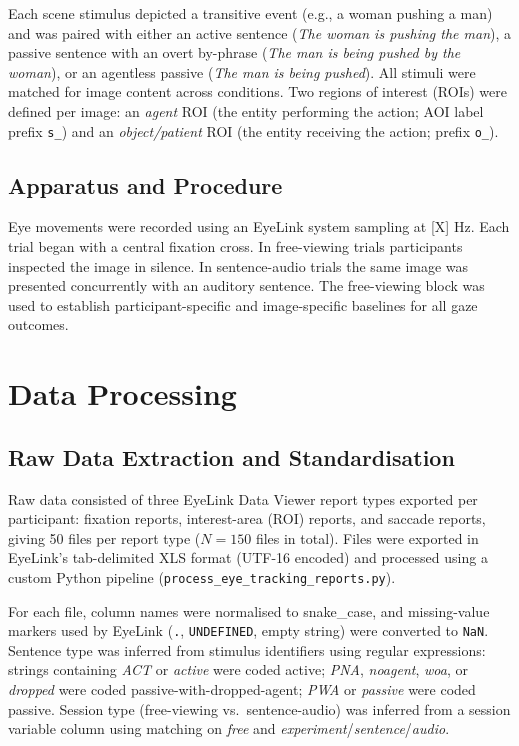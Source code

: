 \documentclass[12pt, a4paper]{article}
\begin{document}
Each scene stimulus depicted a transitive event (e.g., a woman pushing a man)
and was paired with either an active sentence (\textit{The woman is pushing the man}),
a passive sentence with an overt by-phrase (\textit{The man is being pushed by the woman}),
or an agentless passive (\textit{The man is being pushed}).
All stimuli were matched for image content across conditions.
Two regions of interest (ROIs) were defined per image: an \textit{agent} ROI
(the entity performing the action; AOI label prefix \texttt{s\_}) and an
\textit{object/patient} ROI (the entity receiving the action; prefix \texttt{o\_}).

\subsection{Apparatus and Procedure}

Eye movements were recorded using an EyeLink system sampling at [X] Hz.
Each trial began with a central fixation cross.
In free-viewing trials participants inspected the image in silence.
In sentence-audio trials the same image was presented concurrently with an
auditory sentence.
The free-viewing block was used to establish participant-specific and
image-specific baselines for all gaze outcomes.

\section{Data Processing}

\subsection{Raw Data Extraction and Standardisation}

Raw data consisted of three EyeLink Data Viewer report types exported per
participant: fixation reports, interest-area (ROI) reports, and saccade reports,
giving 50 files per report type ($N = 150$ files in total).
Files were exported in EyeLink's tab-delimited XLS format (UTF-16 encoded) and
processed using a custom Python pipeline (\texttt{process\_eye\_tracking\_reports.py}).

For each file, column names were normalised to snake\_case, and
missing-value markers used by EyeLink (\texttt{.}, \texttt{UNDEFINED},
empty string) were converted to \texttt{NaN}.
Sentence type was inferred from stimulus identifiers using regular expressions:
strings containing \textit{ACT} or \textit{active} were coded active;
\textit{PNA}, \textit{noagent}, \textit{woa}, or \textit{dropped} were coded
passive-with-dropped-agent; \textit{PWA} or \textit{passive} were coded passive.
Session type (free-viewing vs.\ sentence-audio) was inferred from a session
variable column using matching on \textit{free} and \textit{experiment}/\textit{sentence}/\textit{audio}.
\end{document}
